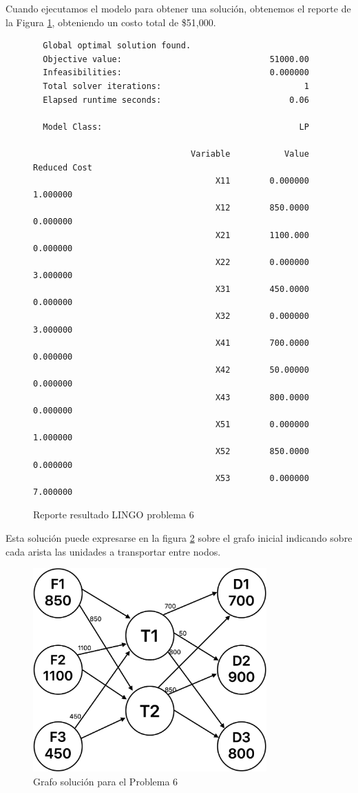 \documentclass[12pt]{article}  %
\begin{document}
Cuando ejecutamos el modelo para obtener una solución, obtenemos el reporte de la Figura \ref{fig:reporteProb6}, obteniendo un costo total de \$51,000.

\begin{figure}[H]
	\centering
	\caption{Reporte resultado LINGO problema 6}
	\label{fig:reporteProb6}
	\begin{verbatim}
  Global optimal solution found.
  Objective value:                              51000.00
  Infeasibilities:                              0.000000
  Total solver iterations:                             1
  Elapsed runtime seconds:                          0.06

  Model Class:                                        LP

                                Variable           Value        Reduced Cost
                                     X11        0.000000            1.000000
                                     X12        850.0000            0.000000
                                     X21        1100.000            0.000000
                                     X22        0.000000            3.000000
                                     X31        450.0000            0.000000
                                     X32        0.000000            3.000000
                                     X41        700.0000            0.000000
                                     X42        50.00000            0.000000
                                     X43        800.0000            0.000000
                                     X51        0.000000            1.000000
                                     X52        850.0000            0.000000
                                     X53        0.000000            7.000000
	\end{verbatim}
\end{figure}

Esta solución puede expresarse en la figura \ref{fig:resProb6} sobre el grafo inicial indicando sobre cada arista las unidades a transportar entre nodos.

\begin{figure}[h]
    \centering
    \caption{Grafo solución para el Problema 6}
    \label{fig:resProb6}
    \includegraphics[width=0.8\textwidth]{GrafoSolProb6.png}
\end{figure}
\end{document}

